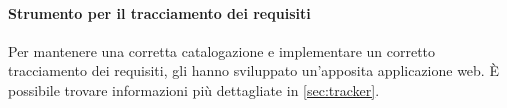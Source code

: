 			\paragraph{Strumento per il tracciamento dei requisiti}
			Per mantenere una corretta catalogazione e implementare un corretto tracciamento dei requisiti, gli  hanno sviluppato un'apposita applicazione web. È possibile trovare informazioni più dettagliate in \autoref{sec:tracker}.